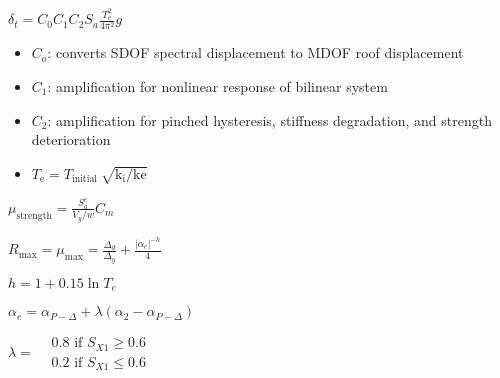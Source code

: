 \(\delta_{t}=C_{0} C_{1} C_{2} S_{a} \frac{T_{e}^{2}}{4 \pi^{2}} g\)

\begin{itemize}
\tightlist
\item
  \(C_{o}\): converts SDOF spectral displacement to MDOF roof
  displacement
\item
  \(C_{1}\): amplification for nonlinear response of bilinear system
\item
  \(C_{2}\): amplification for pinched hysteresis, stiffness
  degradation, and strength deterioration
\item
  \(T_{\text {e}}=T_{\text {initial }} \sqrt{\mathrm{k}_{\mathrm{i}} / \mathrm{ke}}\)
\end{itemize}

\(\mu_{\text {strength}}=\frac{S_{a}^{e}}{V_{y} / w} C_{m}\)

\(R_{\max }=\mu_{\max }=\frac{\Delta_{d}}{\Delta_{y}}+\frac{\left|\alpha_{e}\right|^{-h}}{4}\)

\(h =1+0.15 \ln T_{e}\)

\(\alpha_{e} =\alpha_{P-\Delta}+\lambda\left(\alpha_{2}-\alpha_{P-\Delta}\right)\)

\(\lambda = \begin{aligned} &0.8 \text { if } S_{X 1} \geq 0.6\\ &0.2 \text { if } S_{X 1} \leq 0.6 \end{aligned}\)
